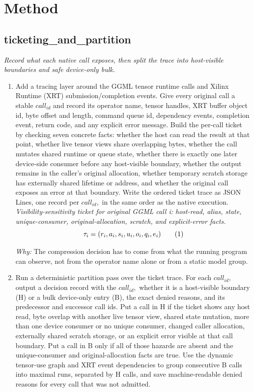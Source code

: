 \documentclass[10pt,a4paper]{article}
\begin{document}
\section*{Method}
\subsection*{ticketing\_and\_partition}
\emph{Record what each native call exposes, then split the trace into host-visible boundaries and safe device-only bulk.}
\begin{enumerate}[leftmargin=*,start=1]
  \item Add a tracing layer around the GGML tensor runtime calls and Xilinx Runtime (XRT) submission/completion events. Give every original call a stable \(call_{id}\) and record its operator name, tensor handles, XRT buffer object id, byte offset and length, command queue id, dependency events, completion event, return code, and any explicit error message. Build the per-call ticket by checking seven concrete facts: whether the host can read the result at that point, whether live tensor views share overlapping bytes, whether the call mutates shared runtime or queue state, whether there is exactly one later device-side consumer before any host-visible boundary, whether the output remains in the caller's original allocation, whether temporary scratch storage has externally shared lifetime or address, and whether the original call exposes an error at that boundary. Write the ordered ticket trace as JSON Lines, one record per \(call_{id},\) in the same order as the native execution.
\noindent\emph{Visibility-sensitivity ticket for original GGML call i: host-read, alias, state, unique-consumer, original-allocation, scratch, and explicit-error facts.}
\begin{equation}
\resizebox{\ifdim\width>\linewidth \linewidth\else\width\fi}{!}{$\displaystyle \tau_i = (r_i,a_i,s_i,u_i,o_i,q_i,e_i)$} \tag{1}
\end{equation}
\par\emph{Why:} The compression decision has to come from what the running program can observe, not from the operator name alone or from a static model group.
  \item Run a deterministic partition pass over the ticket trace. For each \(call_{id},\) output a decision record with the \(call_{id},\) whether it is a host-visible boundary (H) or a bulk device-only entry (B), the exact denied reasons, and its predecessor and successor call ids. Put a call in H if the ticket shows any host read, byte overlap with another live tensor view, shared state mutation, more than one device consumer or no unique consumer, changed caller allocation, externally shared scratch storage, or an explicit error visible at that call boundary. Put a call in B only if all of those hazards are absent and the unique-consumer and original-allocation facts are true. Use the dynamic tensor-use graph and XRT event dependencies to group consecutive B calls into maximal runs, separated by H calls, and save machine-readable denied reasons for every call that was not admitted.

\end{enumerate}
\end{document}
